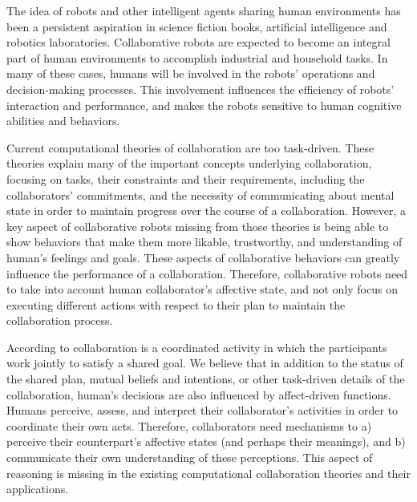 \documentclass[12pt]{report}
\begin{document}
The idea of robots and other intelligent agents sharing human environments has
been a persistent aspiration in science fiction books, artificial intelligence
and robotics laboratories. Collaborative robots are expected to become an
integral part of human environments to accomplish industrial and household
tasks. In many of these cases, humans will be involved in the robots' operations
and decision-making processes. This involvement influences the efficiency of
robots' interaction and performance, and makes the robots sensitive to human
cognitive abilities and behaviors.

Current computational theories of collaboration are too task-driven. These
theories explain many of the important concepts underlying collaboration,
focusing on tasks, their constraints and their requirements, including the
collaborators' commitments, and the necessity of communicating about mental
state in order to maintain progress over the course of a collaboration. However,
a key aspect of collaborative robots missing from those theories is being able
to show behaviors that make them more likable, trustworthy, and understanding of
human's feelings and goals. These aspects of collaborative behaviors can greatly
influence the performance of a collaboration. Therefore, collaborative robots
need to take into account human collaborator's affective state, and not only
focus on executing different actions with respect to their plan to maintain the
collaboration process.

According to \cite{grosz:plans-discourse} collaboration is a coordinated
activity in which the participants work jointly to satisfy a shared goal. We
believe that in addition to the status of the shared plan, mutual beliefs and
intentions, or other task-driven details of the collaboration, human's decisions
are also influenced by affect-driven functions. Humans perceive, assess, and
interpret their collaborator's activities in order to coordinate their own acts.
Therefore, collaborators need mechanisms to a) perceive their counterpart's
affective states (and perhaps their meanings), and b) communicate their own
understanding of these perceptions. This aspect of reasoning is missing in the
existing computational collaboration theories and their applications.
\end{document}
